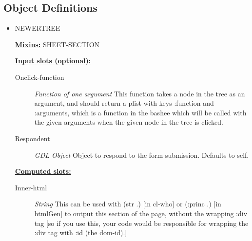 \documentclass [11pt]{book}
\begin{document}
\subsection{Object Definitions}

\label{subsec:objectdefinitions}



\begin{itemize}

\item {}NEWERTREE


\textbf{
\underline{Mixins:}} SHEET-SECTION





\begin{description}

\end{description}








\textbf{
\underline{Input slots (optional):}}

\begin{description}

\item [Onclick-function]
\emph{Function of one argument} This function takes a node in the tree as an argument, and should return
a plist with keys :function and :arguments, which is a function in the bashee which will be called
with the given arguments when the given node in the tree is clicked.


\item [Respondent]
\emph{GDL Object} Object to respond to the form submission. Defaults to self.


\end{description}






\textbf{
\underline{Computed slots:}}

\begin{description}

\item [Inner-html]
\emph{String} This can be used with (str .) [in cl-who] or (:princ .) [in htmlGen]
to output this section of the page, without the wrapping :div tag [so if you use this,
your code would be responsible for wrapping the :div tag with :id (the dom-id).]



\end{description}
\end{itemize}
\end{document}
